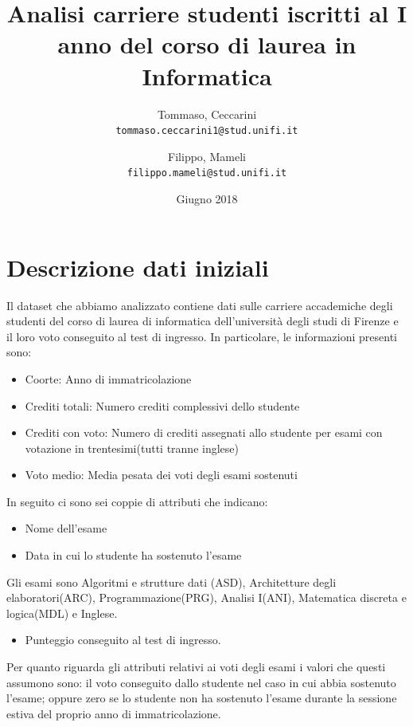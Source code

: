 \documentclass[12pt]{article}
\begin{document}
\title{Analisi carriere studenti iscritti al I anno del corso di laurea in Informatica}
\author{
  Tommaso, Ceccarini\\
  \texttt{tommaso.ceccarini1@stud.unifi.it}
  \and
  Filippo, Mameli\\
  \texttt{filippo.mameli@stud.unifi.it}
}
\date{Giugno 2018}
\maketitle

\newpage

\tableofcontents

\newpage


\section{Descrizione dati iniziali}
Il dataset che abbiamo analizzato contiene dati sulle carriere accademiche degli studenti del corso di laurea di informatica dell'università degli studi di Firenze e il loro voto conseguito 
al test di ingresso. In particolare, le informazioni presenti sono:
\begin{itemize}
	\item Coorte: Anno di immatricolazione
	\item Crediti totali: Numero crediti complessivi dello studente
	\item Crediti con voto: Numero di crediti assegnati allo studente per esami con votazione in trentesimi(tutti tranne inglese)
	\item Voto medio: Media pesata dei voti degli esami sostenuti
\end{itemize}
In seguito ci sono sei coppie di attributi che indicano:
\begin{itemize}
	\item Nome dell'esame
	\item Data in cui lo studente ha sostenuto l'esame
\end{itemize}
Gli esami sono Algoritmi e strutture dati (ASD), Architetture degli elaboratori(ARC), Programmazione(PRG), Analisi I(ANI), Matematica discreta e logica(MDL) e Inglese.
\begin{itemize}
	\item Punteggio conseguito al test di ingresso.
\end{itemize}

Per quanto riguarda gli attributi relativi ai voti degli esami i valori che questi assumono sono:
il voto conseguito dallo studente nel caso in cui abbia sostenuto l'esame;
oppure zero se lo studente non ha sostenuto l'esame durante la sessione estiva del proprio anno di immatricolazione.
\end{document}
